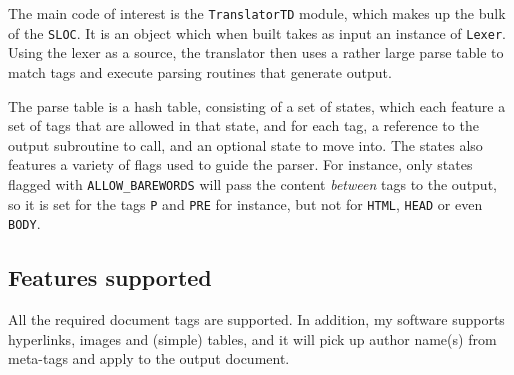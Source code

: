 \documentclass[a4paper,10pt]{article}
\begin{document}
The main code of interest is the \texttt{TranslatorTD}
 module, which makes up the bulk of the \texttt{SLOC}. It is
 an object which when built takes as input an instance of \texttt{Lexer}.
 Using the lexer as a source, the translator then uses a rather
 large parse table to match tags and execute parsing routines
 that generate output.



The parse table is a hash table, consisting of a set of
 states, which each feature a set of tags that are allowed
 in that state, and for each tag, a reference to the output
 subroutine to call, and an optional state to move into.
 The states also features a variety of flags used to guide
 the parser. For instance, only states flagged with \texttt{ALLOW\_BAREWORDS}
 will pass the content \emph{between} tags to the output,
 so it is set for the tags \texttt{P} and \texttt{PRE}
 for instance, but not for \texttt{HTML}, \texttt{HEAD} or even \texttt{BODY}.



\subsection{Features supported}



All the required document tags are supported. In addition,
 my software supports hyperlinks, images and (simple) tables,
 and it will pick up author name(s) from meta-tags and apply
 to the output document. \\ 
\end{document}
